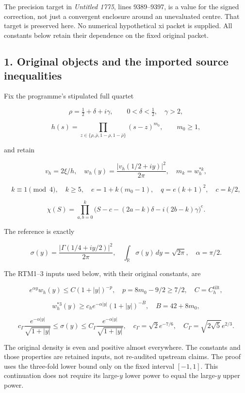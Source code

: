 The precision target in \emph{Untitled 1775}, lines 9389--9397, is a value for the signed correction, not just a convergent enclosure around an unevaluated centre. That target is preserved here. No numerical hypothetical xi packet is supplied. All constants below retain their dependence on the fixed original packet.

\subsection{1. Original objects and the imported source inequalities}\label{acw:original-objects-and-the-imported-source-inequalities}

Fix the programme's stipulated full quartet

\[
\rho=\tfrac12+\delta+i\gamma,\qquad
0<\delta<\tfrac12,\quad\gamma>2,
\]

\[
h(s)=\prod_{z\in\{\rho,\bar\rho,1-\rho,1-\bar\rho\}}(s-z)^{m_0},
\qquad m_0\ge1,
\]

and retain

\[
v_h=2\xi/h,\quad
w_h(y)=\frac{|v_h(1/2+iy)|^2}{2\pi},\quad m_k=w_h^{*k},
\]

\[
k\equiv1\pmod4,\quad k\ge5,\quad e=1+k(m_0-1),\quad
q=e(k+1)^2,\quad c=k/2,
\]

\[
\chi(S)=\prod_{a,b=0}^k
\bigl(S-c-(2a-k)\delta-i(2b-k)\gamma\bigr)^e.
\]

The reference is exactly

\[
\sigma(y)=\frac{|\Gamma(1/4+iy/2)|^2}{2\pi},\quad
\int_{\mathbb R}\sigma(y)\,dy=\sqrt{2\pi},\quad \alpha=\pi/2.
\]

The RTM1--3 inputs used below, with their original constants, are

\[
e^{\alpha y}w_h(y)\le C(1+|y|)^{-p},\quad
p=8m_0-9/2\ge7/2,\quad C=C_h^{\mathrm{tilt}},
\tag{ACW1}
\]

\[
w_h^{*3}(y)\ge c_h e^{-\alpha|y|}(1+|y|)^{-B},
\quad B=42+8m_0,
\]

\[
c_\Gamma\frac{e^{-\alpha|y|}}{\sqrt{1+|y|}}
\le\sigma(y)\le
C_\Gamma\frac{e^{-\alpha|y|}}{\sqrt{1+|y|}},
\quad
c_\Gamma=\sqrt2e^{-7/6},\quad
C_\Gamma=\sqrt{2\sqrt5}e^{2/3}.
\]

The original density is even and positive almost everywhere. The constants and those properties are retained inputs, not re-audited upstream claims. The proof uses the three-fold lower bound only on the fixed interval \([-1,1]\). This continuation does not require its large-\(y\) lower power to equal the large-\(y\) upper power.

